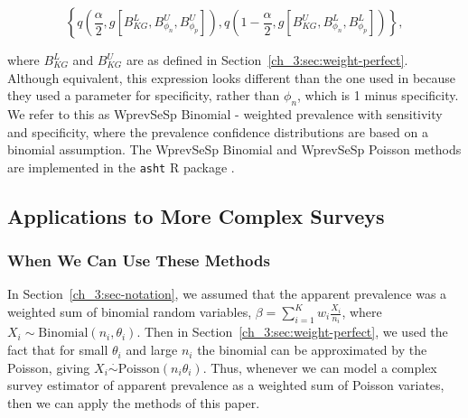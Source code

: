\begin{equation}
    \left\{ q \left( \frac{\alpha}{2}, g\left[B_{KG}^L, B_{\phi_n}^U, B_{\phi_p}^U\right] \right), q \left( 1 - \frac{\alpha}{2}, g\left[B_{KG}^U, B_{\phi_n}^L, B_{\phi_p}^L\right] \right) \right\},
\end{equation}

where \( B_{KG}^L \) and \( B_{KG}^U \) are as defined in Section~\ref{ch_3:sec:weight-perfect}. Although equivalent, this expression looks different than the one used in \citep{Kali:2021} because they used a parameter for specificity, rather than $\phi_n$, which is 1 minus specificity.
We refer to this as WprevSeSp Binomial - weighted prevalence with sensitivity and specificity, where the prevalence confidence distributions are based on a binomial assumption.
The WprevSeSp Binomial and WprevSeSp Poisson methods are implemented in the \texttt{asht} R package \citep{asht}.

\subsection{Applications to More Complex Surveys}
\label{ch_3:sec:complex-surveys}


\subsubsection{When We Can Use These Methods}

In Section~\ref{ch_3:sec-notation}, we assumed that the apparent prevalence was a weighted sum of binomial random variables,
$\beta = \sum_{i=1}^{K} w_i \frac{X_i}{n_i}$, where $X_i \sim \textrm{Binomial}(n_i,\theta_i)$.
Then in Section~\ref{ch_3:sec:weight-perfect}, we used the fact that for small $\theta_i$ and large $n_i$
the binomial can be approximated by the Poisson, giving $X_i \stackrel{\cdot}{\sim} \textrm{Poisson}( n_i \theta_i)$.
Thus, whenever we can model a complex survey estimator of apparent prevalence as a weighted sum of Poisson variates, then we can apply the methods of this paper.

